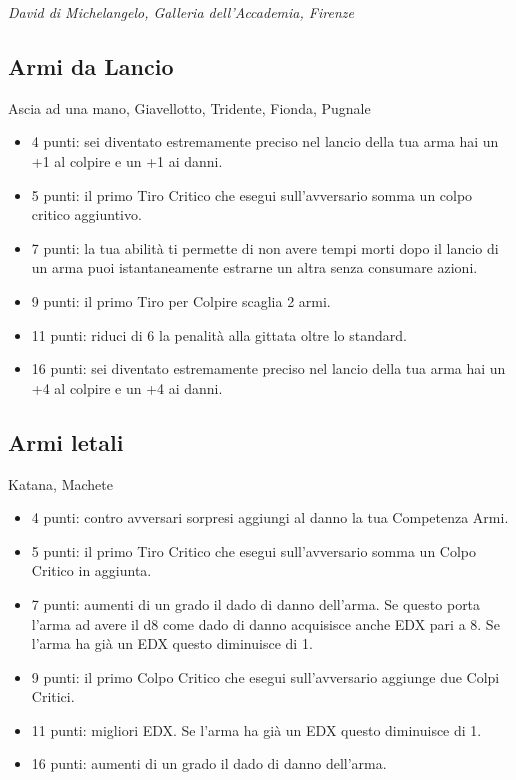 \begin{multicols}{2}
\begin{center}
	\emph{David di Michelangelo, Galleria dell'Accademia, Firenze}
\end{center}

\subsection{Armi da Lancio} Ascia ad una mano, Giavellotto, Tridente, Fionda, Pugnale\label{listarmitiro}

\begin{itemize}[leftmargin=*] \setlength{\itemsep}{0pt}
\item 4 punti: sei diventato estremamente preciso nel lancio della tua arma hai un +1 al colpire e un +1 ai danni.
\item 5 punti: il primo Tiro Critico che esegui sull'avversario somma un colpo critico aggiuntivo.
\item 7 punti: la tua abilità ti permette di non avere tempi morti dopo il lancio di un arma puoi istantaneamente estrarne un altra senza consumare azioni.
\item 9 punti: il primo Tiro per Colpire scaglia 2 armi.
\item 11 punti: riduci di 6 la penalità alla gittata oltre lo standard.
\item 16 punti: sei diventato estremamente preciso nel lancio della tua arma hai un +4 al colpire e un +4 ai danni.
\end{itemize}

\subsection{Armi letali} Katana, Machete\label{listarmiletali}

\begin{itemize}[leftmargin=*] \setlength{\itemsep}{0pt}

\item 4 punti: contro avversari sorpresi aggiungi al danno la tua Competenza Armi.
\item 5 punti: il primo Tiro Critico che esegui sull'avversario somma un Colpo Critico in aggiunta.
\item 7 punti: aumenti di un grado il dado di danno dell'arma. Se questo porta l'arma ad avere il d8 come dado di danno acquisisce anche EDX pari a 8.  Se l'arma ha già un EDX  questo diminuisce di 1.
\item 9 punti: il primo Colpo Critico che esegui sull'avversario aggiunge due Colpi Critici.
\item 11 punti: migliori EDX.  Se l'arma ha già un EDX  questo diminuisce di 1.
\item 16 punti: aumenti di un grado il dado di danno dell'arma.
\end{itemize}


\end{multicols}
